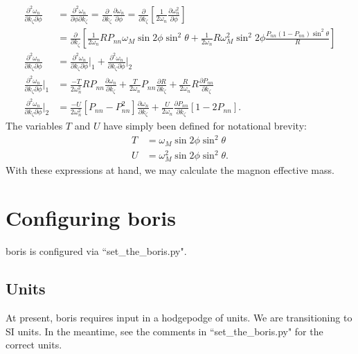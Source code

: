 \documentclass{article}
\begin{document}
\begin{align}
\frac{\partial^2 \omega_{n}}{\partial k_{\zeta} \partial \phi} &= \frac{\partial^2 \omega_{n}}{\partial \phi \partial k_{\zeta}} = \frac{\partial}{\partial k_{\zeta}} \frac{\partial \omega_{n}}{\partial \phi} = \frac{\partial}{\partial k_{\zeta}} \left[\frac{1}{2 \omega_{n}} \frac{\partial \omega_{n}^2}{\partial \phi} \right] \\
&= \frac{\partial}{\partial k_{\zeta}} \left[\frac{1}{2 \omega_{n}} R P_{nn} \omega_{M} \sin{2\phi} \sin^2{\theta} + \frac{1}{2 \omega_{n}} R \omega_{M}^2 \sin^2{2 \phi} \frac{P_{nn} (1 - P_{nn}) \sin^2{\theta}}{R} \right] \\
\frac{\partial^2 \omega_{n}}{\partial k_{\zeta} \partial \phi} &= \frac{\partial^2 \omega_{n}}{\partial k_{\zeta} \partial \phi}\bigg|_{1} + \frac{\partial^2 \omega_{n}}{\partial k_{\zeta} \partial \phi}\bigg|_{2} \\
\frac{\partial^2 \omega_{n}}{\partial k_{\zeta} \partial \phi}\bigg|_{1} &= \frac{-T}{2 \omega_{n}^2} R P_{nn} \frac{\partial \omega_{n}}{\partial k_{\zeta}} + \frac{T}{2 \omega_{n}} P_{nn} \frac{\partial R}{\partial k_{\zeta}} + \frac{R}{2 \omega_{n}} R \frac{\partial P_{nn}}{\partial k_{\zeta}} \\
\frac{\partial^2 \omega_{n}}{\partial k_{\zeta} \partial \phi}\bigg|_{2} &= \frac{- U}{2\omega_{n}^2} \left[P_{nn} - P_{nn}^2 \right] \frac{\partial \omega_{n}}{\partial k_{\zeta}} + \frac{U}{2 \omega_{n}} \frac{\partial P_{nn}}{\partial k_{\zeta}} \left[1 - 2 P_{nn} \right].
\end{align}
The variables $T$ and $U$ have simply been defined for notational brevity:
\begin{align}
T &= \omega_{M} \sin{2 \phi} \sin^2{\theta} \\
U &= \omega_{M}^2 \sin{2 \phi} \sin^2{\theta}.
\end{align}
With these expressions at hand, we may calculate the magnon effective mass.

\section{Configuring boris}
boris is configured via ``set\_{}the\_{}boris.py".
\subsection{Units}
At present, boris requires input in a hodgepodge of units. We are transitioning to SI units. In the meantime, see the comments in ``set\_{}the\_{}boris.py" for the correct units.
\end{document}
